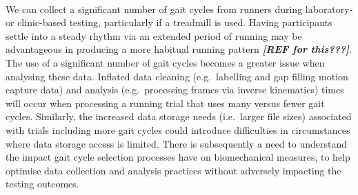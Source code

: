 \documentclass[]{elsarticle} %
\begin{document}
~

We can collect a significant number of gait cycles from runners during
laboratory- or clinic-based testing, particularly if a treadmill is
used. Having participants settle into a steady rhythm via an extended
period of running may be advantageous in producing a more habitual
running pattern \textbf{\emph{{[}REF for this???{]}}}. The use of a
significant number of gait cycles becomes a greater issue when analysing
these data. Inflated data cleaning (e.g.~labelling and gap filling
motion capture data) and analysis (e.g.~processing frames via inverse
kinematics) times will occur when processing a running trial that uses
many versus fewer gait cycles. Similarly, the increased data storage
needs (i.e.~larger file sizes) associated with trials including more
gait cycles could introduce difficulties in circumstances where data
storage access is limited. There is subsequently a need to understand
the impact gait cycle selection processes have on biomechanical
measures, to help optimise data collection and analysis practices
without adversely impacting the testing outcomes.

~
\end{document}

